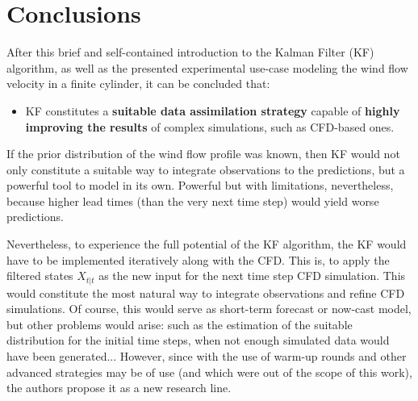 \documentclass{article}
\theoremstyle{definition}
\theoremstyle{definition}
\theoremstyle{remark}
\theoremstyle{mythmstyle}
\begin{document}
\section{Conclusions}

After this brief and self-contained introduction to the Kalman Filter (KF) algorithm, as well as the presented experimental use-case modeling the wind flow velocity in a finite cylinder, it can be concluded that:
\begin{itemize}
    \item KF constitutes a \textbf{suitable data assimilation strategy} capable of \textbf{highly improving the results} of complex simulations, such as CFD-based ones. 
\end{itemize} 

If the prior distribution of the wind flow profile was known, then KF would not only constitute a suitable way to integrate observations to the predictions, but a powerful tool to model in its own. Powerful but with limitations, nevertheless, because higher lead times (than the very next time step) would yield worse predictions.

Nevertheless, to experience the full potential of the KF algorithm, the KF would have to be implemented iteratively along with the CFD. This is, to apply the filtered states $X_{t|t}$ as the new input for the next time step CFD simulation. 
This would constitute the most natural way to integrate observations and refine CFD simulations. Of course, this would serve as short-term forecast or now-cast model, but other problems would arise: such as the estimation of the suitable distribution for the initial time steps, when not enough simulated data would have been generated...
However, since with the use of warm-up rounds and other advanced strategies may be of use (and which were out of the scope of this work), the authors propose it as a new research line.






\end{document}

